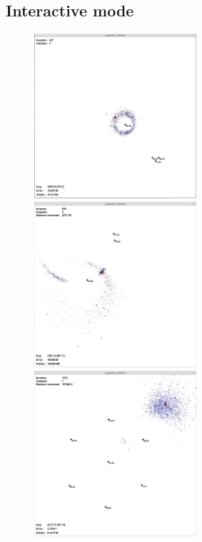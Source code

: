 \documentclass[10pt,a4paper]{book}
\begin{document}
\newpage
\subsection{Interactive mode}




\begin{figure}[H]
\centering
\begin{minipage}{60mm}
  \centering
	\includegraphics[width=60mm]{interactive.png}
\end{minipage}%
\begin{minipage}{60mm}
  \centering
	\includegraphics[width=60mm]{interactive2.png}
\end{minipage}
\begin{minipage}{60mm}
  \centering
	\includegraphics[width=60mm]{interactive3.png}

\end{minipage}
\end{figure}
\end{document}
